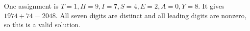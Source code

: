 One assignment is $T=1,H=9,I=7,S=4,E=2,A=0,Y=8$. It gives $1974+74=2048$. All seven digits are distinct and all leading digits are nonzero, so this is a valid solution.
